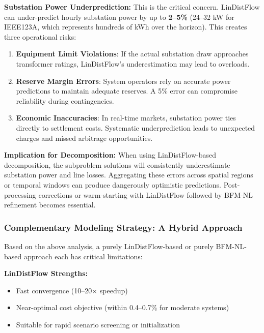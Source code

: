 \textbf{Substation Power Underprediction:} This is the critical concern. LinDistFlow can under-predict hourly substation power by up to \textbf{2--5\%} (24--32 kW for IEEE123A, which represents hundreds of kWh over the horizon). This creates three operational risks:

\begin{enumerate}
    \item \textbf{Equipment Limit Violations}: If the actual substation draw approaches transformer ratings, LinDistFlow's underestimation may lead to overloads.
    
    \item \textbf{Reserve Margin Errors}: System operators rely on accurate power predictions to maintain adequate reserves. A 5\% error can compromise reliability during contingencies.
    
    \item \textbf{Economic Inaccuracies}: In real-time markets, substation power ties directly to settlement costs. Systematic underprediction leads to unexpected charges and missed arbitrage opportunities.
\end{enumerate}

\textbf{Implication for Decomposition:} When using LinDistFlow-based decomposition, the subproblem solutions will consistently underestimate substation power and line losses. Aggregating these errors across spatial regions or temporal windows can produce dangerously optimistic predictions. Post-processing corrections or warm-starting with LinDistFlow followed by BFM-NL refinement becomes essential.

\subsubsection{Complementary Modeling Strategy: A Hybrid Approach}

Based on the above analysis, a purely LinDistFlow-based or purely BFM-NL-based approach each has critical limitations:

\textbf{LinDistFlow Strengths:}
\begin{itemize}
    \item Fast convergence (10--20× speedup)
    \item Near-optimal cost objective (within 0.4--0.7\% for moderate systems)
    \item Suitable for rapid scenario screening or initialization
\end{itemize}

